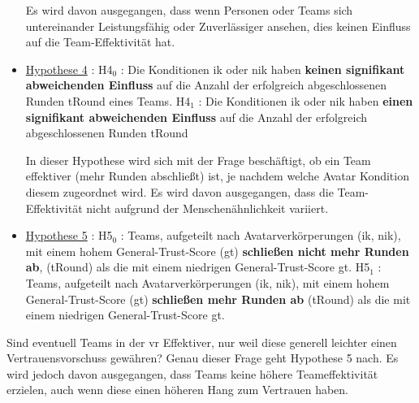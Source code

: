 \documentclass[a4paper,11pt]{article}%
\renewcommand{\\}{\vspace*{0.5\baselineskip} \newline}
\begin{document}
\begin{itemize}
Es wird davon ausgegangen, dass wenn Personen oder Teams sich untereinander Leistungsfähig oder Zuverlässiger ansehen, dies keinen Einfluss auf die Team-Effektivität hat. 
	
	\item{\underline{Hypothese 4} :\\ 
	H4$_{0}$ : Die Konditionen \ac{ik} oder \ac{nik} haben \textbf{keinen signifikant abweichenden Einfluss} auf die Anzahl der erfolgreich abgeschlossenen Runden \ac{tRound} eines Teams.\newline
	H4$_{1}$ : Die Konditionen \ac{ik} oder \ac{nik} haben \textbf{einen signifikant abweichenden Einfluss} auf die Anzahl der erfolgreich abgeschlossenen Runden \ac{tRound}}
	
	
In dieser Hypothese wird sich mit der Frage beschäftigt, ob ein Team effektiver (mehr Runden abschließt) ist, je nachdem welche Avatar Kondition diesem zugeordnet wird. Es wird davon ausgegangen, dass die Team-Effektivität nicht aufgrund der Menschenähnlichkeit variiert.

	\item{\underline{Hypothese 5} :\\ 
	H5$_{0}$ : Teams, aufgeteilt nach Avatarverkörperungen (\ac{ik}, \ac{nik}), mit einem hohem General-Trust-Score (\ac{gt}) \textbf{schließen nicht mehr Runden ab}, (\ac{tRound}) als die mit einem niedrigen General-Trust-Score \ac{gt}.\newline
	H5$_{1}$ :  Teams, aufgeteilt nach Avatarverkörperungen (\ac{ik}, \ac{nik}), mit einem hohem General-Trust-Score (\ac{gt}) \textbf{schließen mehr Runden ab} (\ac{tRound}) als die mit einem niedrigen General-Trust-Score \ac{gt}}.
\end{itemize}

Sind eventuell Teams in der \ac{vr} Effektiver, nur weil diese generell leichter einen Vertrauensvorschuss gewähren? Genau dieser Frage geht Hypothese 5 nach. Es wird jedoch davon ausgegangen, dass Teams keine höhere Teameffektivität erzielen, auch wenn diese einen höheren Hang zum Vertrauen haben.
\end{document}
